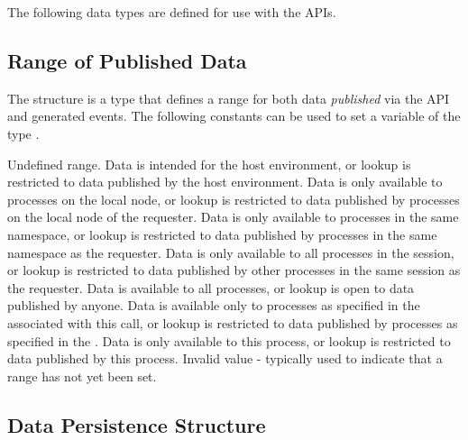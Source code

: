The following data types are defined for use with the  \acp{API}.

\subsection{Range of Published Data}

The  structure is a  type that defines a range for both data \textit{published} via the  \ac{API} and generated events.
The following constants can be used to set a variable of the type .

\begin{constantdesc}
%
Undefined range.
%
Data is intended for the host environment, or lookup is restricted to data published by the host environment.
%
Data is only available to processes on the local node, or lookup is restricted to data published by processes on the local node of the requester.
%
Data is only available to processes in the same namespace, or lookup is restricted to data published by processes in the same namespace as the requester.
%
Data is only available to all processes in the session, or lookup is restricted to data published by other processes in the same session as the requester.
%
Data is available to all processes, or lookup is open to data published by anyone.
%
Data is available only to processes as specified in the  associated with this call, or lookup is restricted to data published by processes as specified in the .
%
Data is only available to this process, or lookup is restricted to data published by this process.
%
Invalid value - typically used to indicate that a range has not yet been set.
%
\end{constantdesc}


\subsection{Data Persistence Structure}

